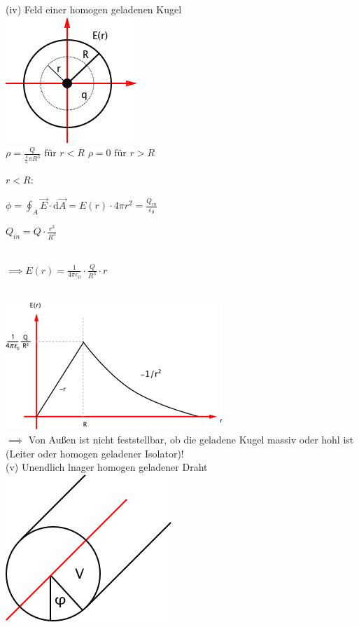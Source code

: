 \documentclass[11pt]{article}
\begin{document}
(iv) Feld einer homogen geladenen Kugel\\

\includegraphics{skizzen/14/14_6B6}\\

$ \rho =\frac{Q}{\frac{4}{3}\pi R^3} \text{ für }r<R $
$ \rho=0 \text{ für }r>R$

\underline{$r<R$}:

$ \phi=\oint_{A}\vec{E}\cdot\mathrm{d}\vec{A} = E(r)\cdot4\pi r^2=\frac{Q_{in}}{\epsilon_0}$

$ Q_{in} = Q\cdot\frac{r^3}{R^3} $

\hfill\\

$\boxed{ \implies E(r)=\frac{1}{4\pi\epsilon_0}\cdot\frac{Q}{R^3}\cdot r }$

\hfill\\

\includegraphics{skizzen/14/14_6B7}\\

$\implies$ Von Au\ss{}en ist nicht feststellbar, ob die geladene Kugel massiv oder hohl ist (Leiter oder homogen geladener Isolator)!\\

(v) Unendlich lnager homogen geladener Draht\\

\includegraphics{skizzen/14/14_6B8}\\
\end{document}
